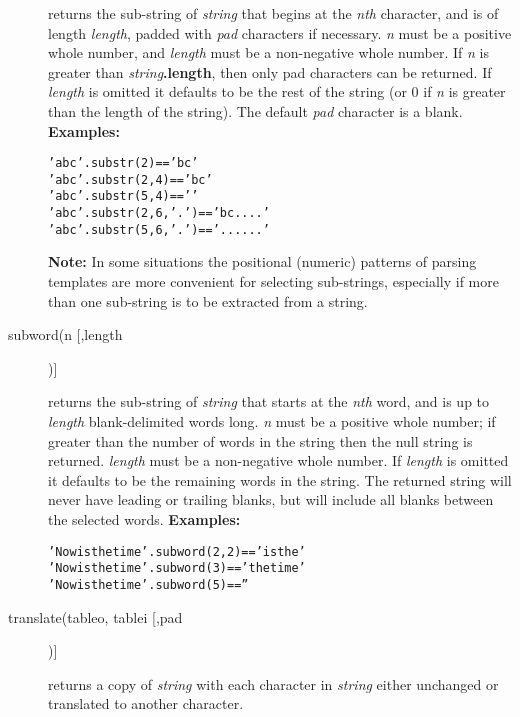 \begin{description}
returns the sub-string of \emph{string} that begins at the
\emph{n}\emph{th} character, and is of length \emph{length}, padded
with \emph{pad} characters if necessary.
\emph{n} must be a positive whole number, and \emph{length} must
be a non-negative whole number.
If \emph{n} is greater than \emph{string}\textbf{.length},
then only pad characters can be returned.
 If \emph{length} is omitted it defaults to be the rest of the
string (or 0 if \emph{n} is greater than the length of the string).
The default \emph{pad} character is a blank.
 \textbf{Examples:}
\begin{alltt}
'abc'.substr(2)       == 'bc'
'abc'.substr(2,4)     == 'bc  '
'abc'.substr(5,4)     == '    '
'abc'.substr(2,6,'.') == 'bc....'
'abc'.substr(5,6,'.') == '......'
\end{alltt}
\textbf{Note: }In some situations the positional (numeric) patterns of parsing
templates are more convenient for selecting sub-strings, especially if
more than one sub-string is to be extracted from a string.
\item[subword(n [,length])]\label{refsubword}

returns the sub-string of \emph{string} that starts at the
\emph{n}\emph{th} word, and is up to \emph{length} blank-delimited
words long.
\emph{n} must be a positive whole number; if greater than the number
of words in the string then the null string is returned.
\emph{length} must be a non-negative whole number.
If \emph{length} is omitted it defaults to be the remaining words
in the string.
The returned string will never have leading or trailing blanks, but
will include all blanks between the selected words.
 \textbf{Examples:}
\begin{alltt}
'Now is the  time'.subword(2,2) == 'is the'
'Now is the  time'.subword(3)   == 'the  time'
'Now is the  time'.subword(5)   == ''
\end{alltt}
\item[translate(tableo, tablei [,pad])]\label{reftrans}
\index{,}

returns a copy of \emph{string} with each character in
\emph{string} either unchanged or translated to another character.
 

\end{description}
